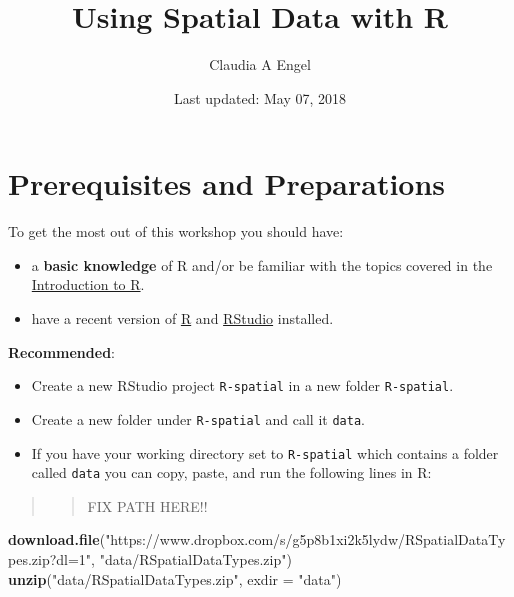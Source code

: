 \documentclass[]{book}
\title{Using Spatial Data with R}
\author{Claudia A Engel}
\date{Last updated: May 07, 2018}
\newenvironment{Shaded}{\begin{snugshade}}{\end{snugshade}}
\newcommand{\KeywordTok}[1]{\textcolor[rgb]{0.13,0.29,0.53}{\textbf{#1}}}
\newcommand{\DataTypeTok}[1]{\textcolor[rgb]{0.13,0.29,0.53}{#1}}
\newcommand{\StringTok}[1]{\textcolor[rgb]{0.31,0.60,0.02}{#1}}
\newcommand{\NormalTok}[1]{#1}
\providecommand{\tightlist}{%
  \setlength{\itemsep}{0pt}\setlength{\parskip}{0pt}}
\theoremstyle{definition}
\theoremstyle{definition}
\theoremstyle{definition}
\theoremstyle{remark}
\begin{document}
\maketitle

{
\setcounter{tocdepth}{1}
\tableofcontents
}
\chapter*{Prerequisites and
Preparations}\label{prerequisites-and-preparations}

To get the most out of this workshop you should have:

\begin{itemize}
\tightlist
\item
  a \textbf{basic knowledge} of R and/or be familiar with the topics
  covered in the \href{https://cengel.github.io/R-intro/}{Introduction
  to R}.
\item
  have a recent version of \href{https://cran.r-project.org/}{R} and
  \href{https://www.rstudio.com/}{RStudio} installed.
\end{itemize}

\textbf{Recommended}:

\begin{itemize}
\item
  Create a new RStudio project \texttt{R-spatial} in a new folder
  \texttt{R-spatial}.
\item
  Create a new folder under \texttt{R-spatial} and call it
  \texttt{data}.
\item
  If you have your working directory set to \texttt{R-spatial} which
  contains a folder called \texttt{data} you can copy, paste, and run
  the following lines in R:
\end{itemize}

\begin{quote}
\begin{quote}
FIX PATH HERE!!
\end{quote}
\end{quote}

\begin{Shaded}
\begin{Highlighting}[]
\KeywordTok{download.file}\NormalTok{(}\StringTok{"https://www.dropbox.com/s/g5p8b1xi2k5lydw/RSpatialDataTypes.zip?dl=1"}\NormalTok{, }\StringTok{"data/RSpatialDataTypes.zip"}\NormalTok{)}
\KeywordTok{unzip}\NormalTok{(}\StringTok{"data/RSpatialDataTypes.zip"}\NormalTok{, }\DataTypeTok{exdir =} \StringTok{"data"}\NormalTok{)}
\end{Highlighting}
\end{Shaded}
\end{document}
